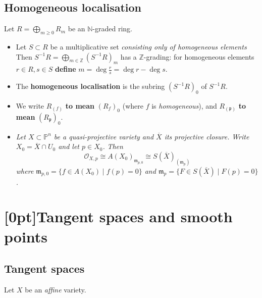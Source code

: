 \documentclass[10pt]{article}
\newcommand{\zz}{\mathbb{Z}}
\newcommand{\nn}{\mathbb{N}}
\newcommand{\pee}{\mathbb{P}}
\newcommand{\prid}{\mathfrak{p}}
\newcommand{\maid}{\mathfrak{m}}
\newcommand{\AG}{\textcolor{green}{AG}}
\begin{document}
        \subsection{Homogeneous localisation}

            Let $R=\bigoplus_{m\geqslant0}R_m$ be an $\nn$-graded ring.

            \begin{itemize}
                \item Let $S\subset R$ be a multiplicative set \emph{consisting only of homogeneous elements}
                    Then $S^{-1}R=\bigoplus_{m\in\zz}(S^{-1}R)_m$ has a $\zz$-grading: for homogeneous elements $r\in R,s\in S$ \textbf{define} $m=\deg\frac{r}{s}=\deg r-\deg s$.
                \item The \textbf{homogeneous localisation} is the subring $(S^{-1}R)_0$ of $S^{-1}R$.
                \item We write $R_{(f)}$ \textbf{to mean} $(R_f)_0$ (where $f$ is \emph{homogeneous}), and $R_{(\prid)}$ \textbf{to mean} $(R_\prid)_0$.
                \item \emph{Let $X\subset\pee^n$ be a quasi-projective variety and $\overline{X}$ its projective closure.}
                    \emph{Write $X_0=\overline{X}\cap U_0$ and let $p\in X_0$.}
                    \emph{Then}
                    \begin{equation*}
                        \mathcal{O}_{X,p} \cong A(X_0)_{\maid_{p,0}} \cong S(\overline{X})_{(\maid_p)}
                    \end{equation*}
                    \emph{where $\maid_{p,0}=\{f\in A(X_0)\mid f(p)=0\}$ and $\maid_p=\{F\in S(\overline{X})\mid F(p)=0\}$.}
            \end{itemize}

    \section{\protect\marginnote{\AG}[0pt]Tangent spaces and smooth points}

        \subsection{Tangent spaces}

            Let $X$ be an \emph{affine} variety.
\end{document}

